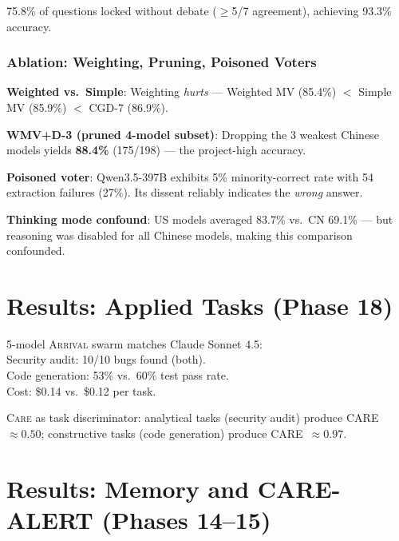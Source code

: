\documentclass[11pt,a4paper]{article}
\newcommand{\arrival}{\textsc{Arrival}\xspace}
\newcommand{\care}{\textsc{Care}\xspace}
\begin{document}
75.8\% of questions locked without debate ($\geq$5/7 agreement),
achieving 93.3\% accuracy.

\subsubsection{Ablation: Weighting, Pruning, Poisoned Voters}

\textbf{Weighted vs.\ Simple}: Weighting \emph{hurts} — Weighted MV
(85.4\%) $<$ Simple MV (85.9\%) $<$ CGD-7 (86.9\%).

\textbf{WMV+D-3 (pruned 4-model subset)}: Dropping the 3 weakest
Chinese models yields \textbf{88.4\%} (175/198) — the project-high
accuracy.

\textbf{Poisoned voter}: Qwen3.5-397B exhibits 5\% minority-correct
rate with 54 extraction failures (27\%).  Its dissent reliably
indicates the \emph{wrong} answer.

\textbf{Thinking mode confound}: US models averaged 83.7\% vs.\ CN
69.1\% — but reasoning was disabled for all Chinese models, making
this comparison confounded.

\section{Results: Applied Tasks (Phase 18)}\label{sec:applied}

\begin{resultbox}
5-model \arrival swarm matches Claude Sonnet 4.5:\\
Security audit: 10/10 bugs found (both).\\
Code generation: 53\% vs.\ 60\% test pass rate.\\
Cost: \$0.14 vs.\ \$0.12 per task.
\end{resultbox}

\care as task discriminator: analytical tasks (security audit)
produce CARE~$\approx0.50$; constructive tasks (code generation)
produce CARE~$\approx0.97$.

\section{Results: Memory and CARE-ALERT (Phases 14--15)}
\end{document}
